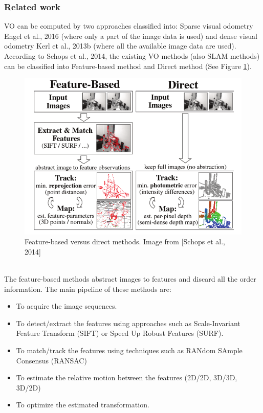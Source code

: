 \subsubsection{Related work}
VO can be computed by two approaches classified into: Sparse visual odometry Engel et al., 2016  (where only a part of the image data is used) and dense visual odometry Kerl et al., 2013b (where all the available image data are used). According to Schops et al., 2014, the existing VO methods (also SLAM methods) can be classified into Feature-based method and Direct method (See Figure \ref{fig:2.3}).
\begin{figure}[h]
    \centering
    \includegraphics[width=\linewidth]{assets/2_3.png}
    \caption{Feature-based versus direct methods. Image from [Schops et al., 2014]}
    \label{fig:2.3}
\end{figure}\\
The feature-based methods abstract images to features and discard all the order information. The main pipeline of these methods are:
\begin{itemize}
    \item To acquire the image sequences.
    \item To detect/extract the features using approaches such as Scale-Invariant Feature Transform (SIFT) or Speed Up Robust Features (SURF).
    \item To match/track the features using techniques such as RANdom SAmple Consensus (RANSAC)
    \item To estimate the relative motion between the features (2D/2D, 3D/3D, 3D/2D)
    \item To optimize the estimated transformation.
\end{itemize}
